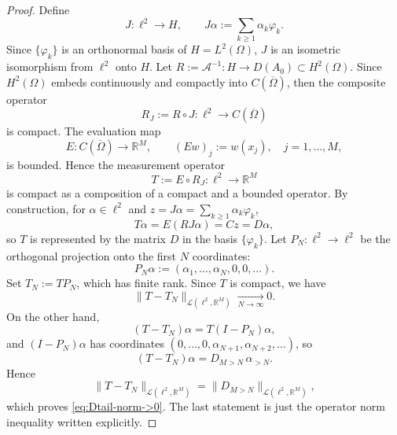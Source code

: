 \documentclass[10pt,a4paper]{amsart}
\begin{document}
\begin{proof}
Define
\[
J:\ell^2 \to H,\qquad J\alpha := \sum_{k\ge1}\alpha_k\varphi_k.
\]
Since $\{\varphi_k\}$ is an orthonormal basis of $H=L^2(\Omega)$, $J$ is an
isometric isomorphism from $\ell^2$ onto $H$.
\noindent
Let $R:=\mathcal A^{-1}:H\to D(A_0)\subset H^2(\Omega)$. Since
$H^2(\Omega)$ embeds continuously and compactly into $C(\overline\Omega)$,
then the composite operator
\[
R_J := R\circ J:\ell^2\to C(\overline\Omega)
\]
is compact. The evaluation map
\[
E: C(\overline\Omega)\to\mathbb{R}^M,\qquad
(Ew)_j := w(x_j),\quad j=1,\dots,M,
\]
is bounded. Hence the measurement operator
\[
T := E\circ R_J:\ell^2\to\mathbb{R}^M
\]
is compact as a composition of a compact and a bounded operator.
\newline
By construction, for $\alpha\in\ell^2$ and
$z=J\alpha=\sum_{k\ge1}\alpha_k\varphi_k$,
\[
T\alpha = E(RJ\alpha) = C z = D\alpha,
\]
so $T$ is represented by the matrix $D$ in the basis $\{\varphi_k\}$.
\newline
Let $P_N:\ell^2\to\ell^2$ be the orthogonal projection onto the first $N$
coordinates:
\[
P_N\alpha := (\alpha_1,\dots,\alpha_N,0,0,\dots).
\]
Set $T_N := T P_N$, which has finite rank. Since $T$ is compact, we have
\[
\|T - T_N\|_{\mathcal{L}(\ell^2,\mathbb{R}^M)}
\xrightarrow[N\to\infty]{} 0.
\]
On the other hand,
\[
(T-T_N)\alpha = T(I-P_N)\alpha,
\]
and $(I-P_N)\alpha$ has coordinates
$(0,\dots,0,\alpha_{N+1},\alpha_{N+2},\dots)$, so
\[
(T-T_N)\alpha = D_{M> N}\,\alpha_{>N}.
\]
Hence
\[
\|T-T_N\|_{\mathcal{L}(\ell^2,\mathbb{R}^M)}
= \|D_{M> N}\|_{\mathcal{L}(\ell^2,\mathbb{R}^M)},
\]
which proves \eqref{eq:Dtail-norm->0}. The last statement is just the
operator norm inequality written explicitly.
\end{proof}
\end{document}
